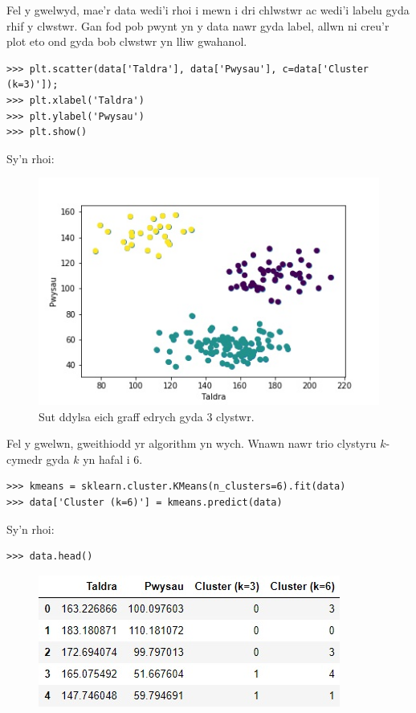 Fel y gwelwyd, mae'r data wedi'i rhoi i mewn i dri chlwstwr ac wedi'i labelu gyda rhif y clwstwr. Gan fod pob pwynt yn y data nawr gyda label, allwn ni creu'r plot eto ond gyda bob clwstwr yn lliw gwahanol.

\begin{verbatim}
>>> plt.scatter(data['Taldra'], data['Pwysau'], c=data['Cluster (k=3)']);
>>> plt.xlabel('Taldra')
>>> plt.ylabel('Pwysau')
>>> plt.show()
\end{verbatim}

Sy'n rhoi:

\begin{figure}[H]
\begin{center}
\includegraphics[width=0.7\linewidth]{../img/3clystwrpython.jpeg}
\caption{Sut ddylsa eich graff edrych gyda 3 clystwr.}
\label{fig:3clystwrpython}
\end{center}
\end{figure}

Fel y gwelwn, gweithiodd yr algorithm yn wych. Wnawn nawr trio clystyru $k$-cymedr gyda $k$ yn hafal i 6.

\begin{verbatim}
>>> kmeans = sklearn.cluster.KMeans(n_clusters=6).fit(data)
>>> data['Cluster (k=6)'] = kmeans.predict(data)
\end{verbatim}

Sy'n rhoi:

\begin{verbatim}
>>> data.head()
\end{verbatim}

\begin{figure}[H]
\begin{center}
\includegraphics[width=0.35\linewidth]{../img/tabl3.jpg}
\end{center}
\label{fig:Data3}
\end{figure}

